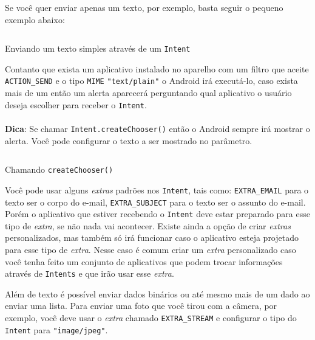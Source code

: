 \documentclass[a4paper,12pt,brazil,oneside]{book}
\begin{document}
		Se você quer enviar apenas um texto, por exemplo, basta seguir o pequeno exemplo abaixo:

		\begin{listing}[H]
		\inputminted[linenos=true,fontsize=\small,frame=lines, framesep=2mm, tabsize=2,numbersep=5pt]{java}{src/api/sharing/simpletext.java}
		\caption{Enviando um texto simples através de um \texttt{Intent}}
		\label{code:simpletext}
		\end{listing} 		

		Contanto que exista um aplicativo instalado no aparelho com um filtro que aceite \texttt{ACTION\_SEND} e o tipo \texttt{MIME} \texttt{"text/plain"} o Android irá executá-lo, caso exista mais de um então um alerta aparecerá perguntando qual aplicativo o usuário deseja escolher para receber o \texttt{Intent}. 

\begin{framed}
\paragraph{}\textbf{Dica}: Se chamar \texttt{Intent.createChooser()} então o Android sempre irá mostrar o alerta. Você pode configurar o texto a ser mostrado no parâmetro.
\textit{}
\end{framed}

		\begin{listing}[H]
		\inputminted[linenos=true,fontsize=\small,frame=lines, framesep=2mm, tabsize=2,numbersep=5pt]{java}{src/api/sharing/createchooser.java}
		\caption{Chamando \texttt{createChooser()}}
		\label{code:createchooser}
		\end{listing} 		

		Você pode usar alguns \emph{extras} padrões nos \texttt{Intent}, tais como: \texttt{EXTRA\_EMAIL} para o texto ser o corpo do e-mail, \texttt{EXTRA\_SUBJECT} para o texto ser o assunto do e-mail. Porém o aplicativo que estiver recebendo o \texttt{Intent} deve estar preparado para esse tipo de \emph{extra}, se não nada vai acontecer. Existe ainda a opção de criar \emph{extras} personalizados, mas também só irá funcionar caso o aplicativo esteja projetado para esse tipo de \emph{extra}. Nesse caso é comum criar um \emph{extra} personalizado caso você tenha feito um conjunto de aplicativos que podem trocar informações através de \texttt{Intents} e que irão usar esse \emph{extra}.

		Além de texto é possível enviar dados binários ou até mesmo mais de um dado ao enviar uma lista. Para enviar uma foto que você tirou com a câmera, por exemplo, você deve usar o \emph{extra} chamado \texttt{EXTRA\_STREAM} e configurar o tipo do \texttt{Intent} para \texttt{"image/jpeg"}.
\end{document}
